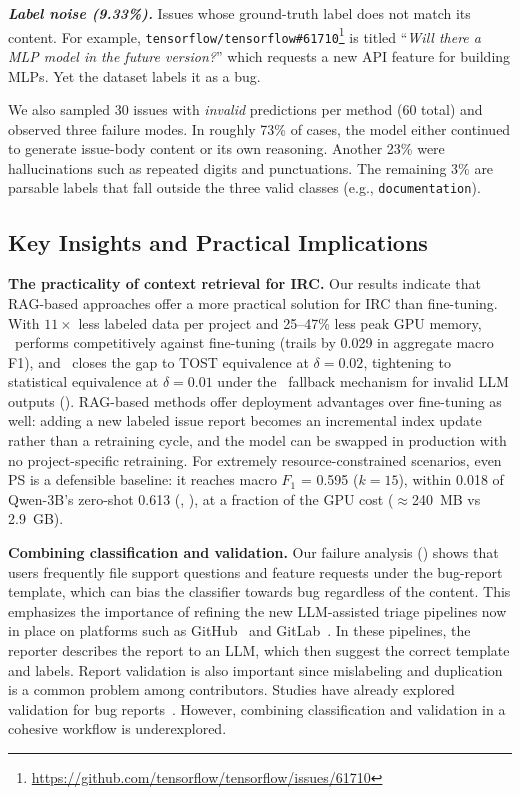 \textbf{\textit{Label noise (9.33\%).}} Issues whose ground-truth label does not match its content. For example, \texttt{tensorflow/tensorflow\#61710}\footnote{\url{https://github.com/tensorflow/tensorflow/issues/61710}} is titled ``\textit{Will there a MLP model in the future version?}'' which requests a new API feature for building MLPs. Yet the dataset labels it as a bug.


We also sampled 30 issues with \textit{invalid} predictions per method (60 total) and observed three failure modes. In roughly 73\% of cases, the model either continued to generate issue-body content or its own reasoning. Another 23\% were hallucinations such as repeated digits and punctuations. The remaining 3\% are parsable labels that fall outside the three valid classes (e.g., \texttt{documentation}).


\subsection{Key Insights and Practical Implications}
\label{sec:disc-insights}

\textbf{The practicality of context retrieval for IRC.} Our results indicate that RAG-based approaches offer a more practical solution for IRC than fine-tuning. With $11\times$ less labeled data per project and 25--47\% less peak GPU memory, \ragtag\ performs competitively against fine-tuning (trails by 0.029 in aggregate macro F1), and \bragtag\ closes the gap to TOST equivalence at $\delta{=}0.02$, tightening to statistical equivalence at $\delta{=}0.01$ under the \votag\ fallback mechanism for invalid LLM outputs (). RAG-based methods offer deployment advantages over fine-tuning as well: adding a new labeled issue report becomes an incremental index update rather than a retraining cycle, and the model can be swapped in production with no project-specific retraining. For extremely resource-constrained scenarios, even \votag PS is a defensible baseline: it reaches macro $F_1$ = 0.595 ($k{=}15$), within 0.018 of Qwen-3B's zero-shot 0.613 (, ), at a fraction of the GPU cost ($\approx$240~MB vs 2.9~GB).

\textbf{Combining classification and validation.} Our failure analysis () shows that users frequently file support questions and feature requests under the bug-report template, which can bias the classifier towards bug regardless of the content. This emphasizes the importance of refining the new LLM-assisted triage pipelines now in place on platforms such as GitHub~\cite{githubcopilot} and GitLab~\cite{gitlabduo}. In these pipelines, the reporter describes the report to an LLM, which then suggest the correct template and labels. Report validation is also important since mislabeling and duplication is a common problem among contributors\cite{antoniol2008bug, pandey2017automated}. Studies have already explored validation for bug reports~\cite{khatib2025assertflip, wang2024aegis, ahmed2025otter, dincc2025judge}. However, combining classification and validation in a cohesive workflow is underexplored.

